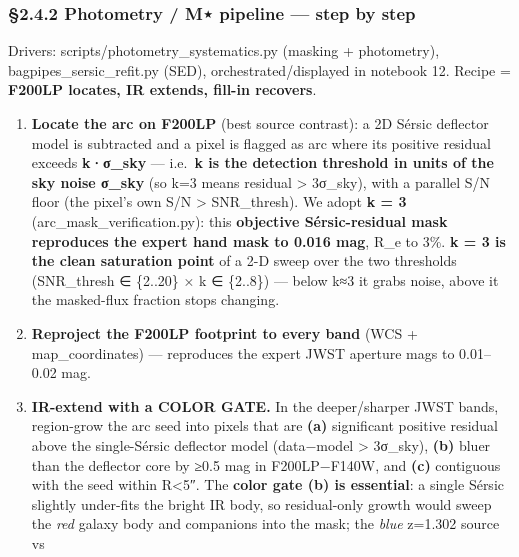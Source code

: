\documentclass[
]{article}
\providecommand{\tightlist}{%
  \setlength{\itemsep}{0pt}\setlength{\parskip}{0pt}}
\newcommand{\BreakablePath}[1]{{\ttfamily\sloppy #1}}
\begin{document}
\hypertarget{photometry-m-pipeline-step-by-step}{%
\subsubsection{§2.4.2 Photometry / M⋆ pipeline --- step by
step}\label{photometry-m-pipeline-step-by-step}}

Drivers:
\BreakablePath{scripts/\discretionary{}{}{}photometry\_\discretionary{}{}{}systematics.\discretionary{}{}{}py}
(masking + photometry),
\BreakablePath{bagpipes\_\discretionary{}{}{}sersic\_\discretionary{}{}{}refit.\discretionary{}{}{}py}
(SED), orchestrated/displayed in notebook 12. Recipe = \textbf{F200LP
locates, IR extends, fill-in recovers}.

\begin{enumerate}
\def\labelenumi{\arabic{enumi}.}
\tightlist
\item
  \textbf{Locate the arc on F200LP} (best source contrast): a 2D Sérsic
  deflector model is subtracted and a pixel is flagged as arc where its
  positive residual exceeds \textbf{k·σ\_sky} --- i.e.~\textbf{k is the
  detection threshold in units of the sky noise σ\_sky} (so k=3 means
  residual \textgreater{} 3σ\_sky), with a parallel S/N floor (the
  pixel's own S/N \textgreater{} SNR\_thresh). We adopt \textbf{k = 3}
  (\BreakablePath{arc\_\discretionary{}{}{}mask\_\discretionary{}{}{}verification.\discretionary{}{}{}py}):
  this \textbf{objective Sérsic-residual mask reproduces the expert hand
  mask to 0.016 mag}, R\_e to 3\%. \textbf{k = 3 is the clean saturation
  point} of a 2-D sweep over the two thresholds (SNR\_thresh ∈ \{2..20\}
  × k ∈ \{2..8\}) --- below k≈3 it grabs noise, above it the masked-flux
  fraction stops changing.
\item
  \textbf{Reproject the F200LP footprint to every band} (WCS +
  \BreakablePath{map\_\discretionary{}{}{}coordinates}) --- reproduces
  the expert JWST aperture mags to 0.01--0.02 mag.
\item
  \textbf{IR-extend with a COLOR GATE.} In the deeper/sharper JWST
  bands, region-grow the arc seed into pixels that are \textbf{(a)}
  significant positive residual above the single-Sérsic deflector model
  (data−model \textgreater{} 3σ\_sky), \textbf{(b)} bluer than the
  deflector core by ≥0.5 mag in F200LP−F140W, and \textbf{(c)}
  contiguous with the seed within R\textless5″. The \textbf{color gate
  (b) is essential}: a single Sérsic slightly under-fits the bright IR
  body, so residual-only growth would sweep the \emph{red} galaxy body
  and companions into the mask; the \emph{blue} z=1.302 source vs

\end{enumerate}
\end{document}
